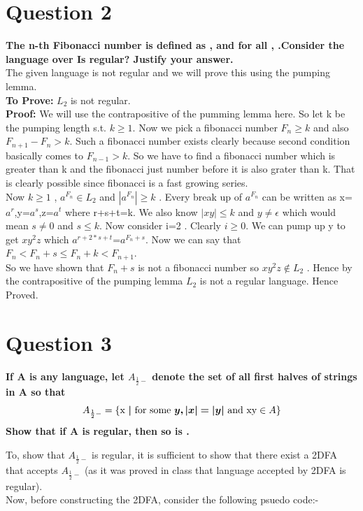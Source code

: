 \documentclass{article}
\begin{document}
\section{Question 2}
\textbf{The n-th Fibonacci number is defined as , and for all ,  .Consider the language over  Is  regular? Justify your answer.}\\
\newline
The given language is not regular and we will prove this using the pumping lemma. \\
\textbf{To Prove:} $L_2$ is not regular.\\
\textbf{Proof:} We will use the contrapositive of the pumming lemma here. So let k be the pumping length s.t. $k\geq 1$. Now we pick a fibonacci number $F_n\geq k$ and also $F_{n+1}-F_{n}>k$. Such a fibonacci number exists clearly because second condition basically comes to $F_{n-1}>k$. So we have to find a fibonacci number which is greater than k and the fibonacci just number before it is also grater than k. That is clearly possible since fibonacci is a fast growing series.\\
Now  $k\geq 1$ , $a^{F_n}\in L_2$ and $|a^{F_n}|\geq k$ . Every break up of $a^{F_n}$ can be written as x=$a^r$,y=$a^s$,z=$a^t$ where r+s+t=k. We also know $|xy|\leq k$ and $y\neq \epsilon$ which would mean $s\neq0$ and $s\leq k$. Now consider i=2 . Clearly  $i\geq0$.
We can pump up y to get $xy^2z$ which $a^{r+2*s+t}$=$a^{F_n+s}$. Now we can say that $F_n<F_n+s\leq F_n+k<F_{n+1}$.\\
So we have shown that $F_n+s$ is not a fibonacci number so $xy^2z\notin L_2$ . Hence by the contrapositive of the pumping lemma $L_2$ is not a regular language. Hence Proved.


\pagebreak



\section{Question 3}
\textbf{If A is any language, let $A_{\frac{1}{2}-}$ denote the set of all first halves of strings in A so that \[ A_{\frac{1}{2}-} = \text{\{x \boldsymbol{$|$} for some \boldsymbol{$y,|x|=|y|$} and xy} \in A\} \] 
        Show that if A is regular, then so is .\\}

To, show that $A_{\frac{1}{2}-}$ is regular, it is sufficient to show that there exist a 2DFA that accepts $A_{\frac{1}{2}-}$ (as it was proved in class that language accepted by 2DFA is regular).\\
Now, before constructing the 2DFA, consider the following psuedo code:- \\
\end{document}
